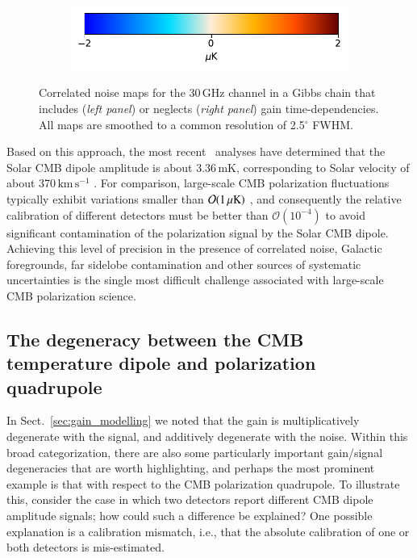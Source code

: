 \documentclass[twocolumn]{aa}
\begin{document}
\begin{figure}[t]
\begin{subfigure}{0.45\textwidth}
       \includegraphics[width=0.95\linewidth]{figs/colorbar_2uK.pdf}
    \end{subfigure}
    \caption{Correlated noise maps for the 30\,GHz channel in a Gibbs chain that includes (\emph{left panel}) or neglects (\emph{right panel}) gain time-dependencies. All maps are smoothed to a common resolution of 2.5$^\circ$ FWHM.}
    \label{fig:ncorr_timedep}
\end{figure}

Based on this approach, the most recent \Planck\ analyses have
determined that the Solar CMB dipole amplitude is about 3.36\,mK,
corresponding to Solar velocity of about
370\,$\textrm{km}\,\textrm{s}^{-1}$ \citep{planck2016-l01,planck2020-LVII}. For
comparison, large-scale CMB polarization fluctuations typically
exhibit variations smaller than $\mathcal{O}(1\muK)$
\citep{planck2016-l04}, and consequently the relative calibration of
different detectors must be better than $\mathcal{O}(10^{-4})$ to
avoid significant contamination of the polarization signal by the Solar CMB
dipole. Achieving this level of precision in the presence of correlated noise,
Galactic foregrounds, far sidelobe contamination and other sources of
systematic uncertainties is the single most difficult challenge associated with
large-scale CMB polarization science.

\subsection{The degeneracy between the CMB temperature dipole and
  polarization quadrupole}
\label{sec:quadrupole}

In Sect.~\ref{sec:gain_modelling} we noted that the gain is multiplicatively
degenerate with the signal, and additively degenerate with the
noise. Within this broad categorization, there are also some
particularly important gain/signal degeneracies that are worth highlighting, and
perhaps the most prominent example is that with respect to the CMB
polarization quadrupole. To illustrate this, consider the case in
which two detectors report different CMB dipole amplitude signals; how could such
a difference be explained? One possible explanation is a calibration
mismatch, i.e., that the absolute calibration of one or both detectors
is mis-estimated.
\end{document}
